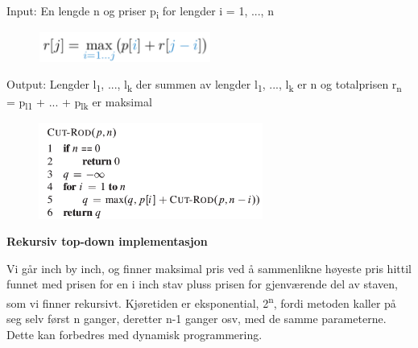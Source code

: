 \documentclass[12pt]{report}
\begin{document}
Input: En lengde n og priser p\textsubscript{i} for lengder i = 1, ..., n\par




\begin{figure}[H]
\advance\leftskip 4.48in		\includegraphics[width=2.23in,height=0.38in]{./media/image51.png}
\end{figure}



Output: Lengder l\textsubscript{1}, ..., l\textsubscript{k} der summen av lengder l\textsubscript{1}, ..., l\textsubscript{k} er n og totalprisen r\textsubscript{n} = p\textsubscript{l1} + ... + p\textsubscript{lk} er maksimal \par


\vspace{\baselineskip}



\begin{figure}[H]
	\begin{Center}
		\includegraphics[width=2.9in,height=1.23in]{./media/image52.png}
	\end{Center}
\end{figure}



\textbf{Rekursiv top-down implementasjon}\par

Vi går inch by inch, og finner maksimal pris ved å sammenlikne høyeste pris hittil funnet med prisen for en i inch stav pluss prisen for gjenværende del av staven, som vi finner rekursivt. Kjøretiden er eksponential, 2\textsuperscript{n}, fordi metoden kaller på seg selv først n ganger, deretter n-1 ganger osv, med de samme parameterne. Dette kan forbedres med dynamisk programmering. \par
\end{document}
